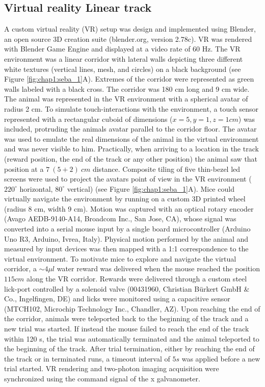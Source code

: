 \subsection{Virtual reality Linear track}
\label{chap3:sec:3:subsec1:linear-track-tracking}
A custom virtual reality (VR) setup was design and implemented using Blender, an open source 3D creation suite (blender.org, version 2.78c). 
VR was rendered with Blender Game Engine and displayed at a video rate of 60 Hz. 
The VR environment was a linear corridor with lateral walls depicting three different white textures (vertical lines, mesh, and circles) on a black background (see Figure \ref{fig:chap1:seba_1}A). 
Extremes of the corridor were represented as green walls labeled with a black cross.
The corridor was 180 cm long and 9 cm wide. 
The animal was represented in the VR environment with a spherical avatar of radius 2 cm.
To simulate touch-interactions with the environment, a touch sensor represented with a rectangular cuboid of dimensions ($x = 5, y = 1, z = 1 cm$) was included, protruding the animals avatar parallel to the corridor floor.
The avatar was used to emulate the real dimensions of the animal in the virtual environment and was never visible to him.
Practically, when arriving to a location in the track (reward position, the end of the track or any other position) the animal saw that position at a $7 \ (5+2) \ cm$ distance.
Composite tiling of five thin-bezel led screens were used to project the avatars point of view in the VR environment ($220^{\circ}$ horizontal, $80^{\circ}$ vertical) (see Figure \ref{fig:chap1:seba_1}A). 
Mice could virtually navigate the environment by running on a custom 3D printed wheel (radius 8 cm, width 9 cm). 
Motion was captured with an optical rotary encoder (Avago AEDB-9140-A14, Broadcom Inc., San Jose, CA), whose signal was converted into a serial mouse input by a single board microcontroller (Arduino Uno R3, Arduino, Ivrea, Italy). 
Physical motion performed by the animal and measured by input devices was then mapped with a 1:1 correspondence to the virtual environment. 
To motivate mice to explore and navigate the virtual corridor, a $\sim 4 \mu l$ water reward was delivered when the mouse reached the position $115 cm$ along the VR corridor. 
Rewards were delivered through a custom steel lick-port controlled by a solenoid valve (00431960, Christian Bürkert GmbH \& Co., Ingelfingen, DE) and licks were monitored using a capacitive sensor (MTCH102, Microchip Technology Inc., Chandler, AZ). 
Upon reaching the end of the corridor, animals were teleported back to the beginning of the track and a new trial was started.
If instead the mouse failed to reach the end of the track within 120 s, the trial was automatically terminated and the animal teleported to the beginning of the track. 
After trial termination, either by reaching the end of the track or in terminated runs,  a timeout interval of $5 s$ was applied before a new trial started.
VR rendering and two-photon imaging acquisition were synchronized using the command signal of the x galvanometer.

